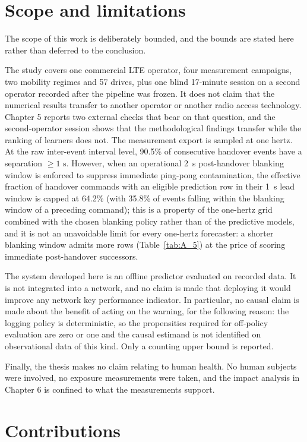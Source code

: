 \section{Scope and limitations}
\label{sec:1_5}

The scope of this work is deliberately bounded, and the bounds are stated here rather than deferred to the conclusion.

The study covers one commercial LTE operator, four measurement campaigns, two mobility regimes and 57 drives, plus one blind 17-minute session on a second operator recorded after the pipeline was frozen. It does not claim that the numerical results transfer to another operator or another radio access technology. Chapter 5 reports two external checks that bear on that question, and the second-operator session shows that the methodological findings transfer while the ranking of learners does not. The measurement export is sampled at one hertz. At the raw inter-event interval level, 90.5\% of consecutive handover events have a separation $\ge 1\text{ s}$. However, when an operational 2~s post-handover blanking window is enforced to suppress immediate ping-pong contamination, the effective fraction of handover commands with an eligible prediction row in their 1~s lead window is capped at 64.2\% (with 35.8\% of events falling within the blanking window of a preceding command); this is a property of the one-hertz grid combined with the chosen blanking policy rather than of the predictive models, and it is not an unavoidable limit for every one-hertz forecaster: a shorter blanking window admits more rows (Table~\ref{tab:A_5}) at the price of scoring immediate post-handover successors.

The system developed here is an offline predictor evaluated on recorded data. It is not integrated into a network, and no claim is made that deploying it would improve any network key performance indicator. In particular, no causal claim is made about the benefit of acting on the warning, for the following reason: the logging policy is deterministic, so the propensities required for off-policy evaluation are zero or one and the causal estimand is not identified on observational data of this kind. Only a counting upper bound is reported.

Finally, the thesis makes no claim relating to human health. No human subjects were involved, no exposure measurements were taken, and the impact analysis in Chapter 6 is confined to what the measurements support.


\section{Contributions}
\label{sec:1_6}

